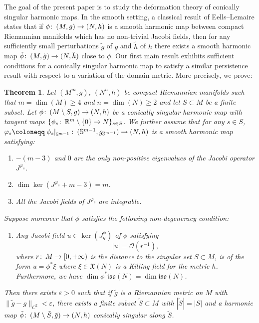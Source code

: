 \documentclass{article}
\numberwithin{equation}{section}        %
\theoremstyle{bfnote}
\newtheorem{thm}{Theorem}[section]          %
\theoremstyle{definition}
\theoremstyle{bfremark}
\newcommand{\col}{\colon \thinspace}        %
\newcommand{\R}{\mathbb{R}}                 %
\newcommand{\Sp}{\mathbb{S}}                %
\begin{document}
The goal of the present paper is to study the deformation theory of conically singular harmonic maps. In the smooth setting, a classical result of Eells--Lemaire \cite{eells1981deformations} states that if $\phi \col (M,g) \to (N,h)$ is a smooth harmonic map between compact Riemannian manifolds which has no non-trivial Jacobi fields, then for any sufficiently small perturbations $\tilde{g}$ of $g$ and $\tilde{h}$ of $h$ there exists a smooth harmonic map $\tilde{\phi} \col (M,\tilde{g}) \to (N,\tilde{h})$ close to $\phi$. Our first main result exhibits sufficient conditions for a conically singular harmonic map to satisfy a similar persistence result with respect to a variation of the domain metric. More precisely, we prove:

\begin{thm}     \label{thm: main theorem introduction}
    Let $(M^m,g)$, $(N^n,h)$ be compact Riemannian manifolds such that $m = \dim(M) \geq 4$ and $n = \dim(N) \geq 2$ and let $S \subset M$ be a finite subset. Let $\phi \col (M \setminus S, g) \to (N,h)$ be a conically singular harmonic map with tangent maps $\{ \phi_s \col \R^m \setminus \{0\} \to N\}_{s \in S}$. We further assume that for any $s \in S$, $\varphi_s \coloneqq \left. \phi_s \right|_{\Sp^{m-1}} \col (\Sp^{m-1},g_{\Sp^{m-1}}) \to (N,h)$ is a smooth harmonic map satisfying:
    \begin{enumerate}
        \item $-(m-3)$ and $0$ are the only non-positive eigenvalues of the Jacobi operator $J^{\varphi_s}$.
        \item $\dim \ker(J^{\varphi_s} + m-3) = m$.
        \item All the Jacobi fields of $J^{\varphi_s}$ are integrable.
    \end{enumerate}
    Suppose moreover that $\phi$ satisfies the following non-degeneracy condition:
    \begin{enumerate}
        \item[4.] Any Jacobi field $u \in \ker(J^\phi_g)$ of $\phi$ satisfying
        \begin{equation*}
            |u| = \mathcal{O}(r^{-1}),
        \end{equation*}
        where $r \col M \to [0,+\infty)$ is the distance to the singular set $S \subset M$, is of the form $u = \phi^* \xi$ where $\xi \in \mathfrak{X}(N)$ is a Killing field for the metric $h$. Furthermore, we have $\dim \phi^*\mathfrak{iso}(N) = \dim \mathfrak{iso}(N)$.
    \end{enumerate}
    Then there exists $\varepsilon > 0$ such that if $\tilde{g}$ is a Riemannian metric on $M$ with $\|\tilde{g} - g\|_{C^2} < \varepsilon$, there exists a finite subset $\tilde{S} \subset M$ with $|\tilde{S}| = |S|$ and a harmonic map $\tilde{\phi} \col (M \setminus \tilde{S}, \tilde{g}) \to (N,h)$ conically singular along $\tilde{S}$. 
\end{thm}
\end{document}
